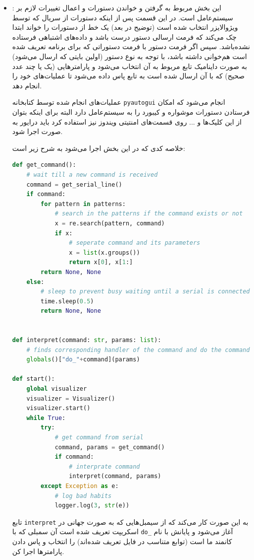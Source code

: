 \documentclass{article}
\begin{document}
\begin{itemize}
	\item {}: این بخش مربوط به گرفتن و خواندن دستورات و اعمال تغییرات لازم بر سیستم‌عامل است.
	در این قسمت پس از اینکه دستورات از سریال که توسط ویژوالایزر انتخاب شده است (توضیح در بعد) یک خط از دستورات را خواند ابتدا چک می‌کند که فرمت ارسالی دستور درست باشد و داده‌های اشتباهی فرستاده نشده‌باشد. سپس اگر فرمت دستور با فرمت دستوراتی که برای برنامه تعریف شده است هم‌خوانی داشته باشد، با توجه به نوع دستور (اولین بایتی که ارسال می‌شود) به صورت داینامیک تابع مربوط به آن انتخاب می‌شود و پارامترهایی (یک یا چند عدد صحیح) که با آن ارسال شده است به تابع پاس داده می‌شود تا عملیات‌های خود را انجام دهد.
	
	عملیات‌های انجام شده توسط کتابخانه
	\verb~pyautogui~ انجام می‌شود که امکان فرستادن دستورات موشواره و کیبورد را به سیستم‌عامل دارد البته برای اینکه بتوان از این کلیک‌ها و ... روی قسمت‌های امنتیتی ویندوز نیز استفاده کرد باید درایور به صورت  اجرا شود. \cite{gui-osk}
	
	خلاصه کدی که در این بخش اجرا می‌شود به شرح زیر است:
\begin{latin}
\begin{lstlisting}[language=python]
def get_command():
    # wait till a new command is received
    command = get_serial_line()
    if command:
        for pattern in patterns:
            # search in the patterns if the command exists or not
            x = re.search(pattern, command)
            if x:
                # seperate command and its parameters
                x = list(x.groups())
                return x[0], x[1:]
        return None, None
    else:
        # sleep to prevent busy waiting until a serial is connected
        time.sleep(0.5)
        return None, None


def interpret(command: str, params: list):
    # finds corresponding handler of the command and do the command
    globals()["do_"+command](params)

def start():
    global visualizer
    visualizer = Visualizer()
    visualizer.start()
    while True:
        try:
            # get command from serial
            command, params = get_command()
            if command:
                # interprate command
                interpret(command, params)
        except Exception as e:
            # log bad habits
            logger.log(3, str(e))
\end{lstlisting}	
\end{latin}

تابع \verb~interpret~ به این صورت کار می‌کند که از سیمبل‌هایی که به صورت جهانی در اسکریپت
تعریف شده است آن سمبلی که با
\verb~do_~
آغاز می‌شود و پایانش با نام کانمند ما است (توابع متناسب در فایل تعریف شده‌اند) را انتخاب و پاس دادن پارامترها اجرا کن.


\end{itemize}
\end{document}
